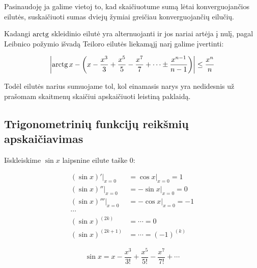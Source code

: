 Pasinaudoję ja galime vietoj to, kad skaičiuotume sumą lėtai 
konverguojančios eilutės, suskaičiuoti sumas dviejų žymiai greičiau
konverguojančių eilučių.

Kadangi $\mathop{\text{arctg}}$ skleidinio eilutė yra alternuojanti ir jos nariai artėja į
nulį, pagal Leibnico požymio išvadą Teiloro eilutės liekamąjį narį galime
įvertinti: 

\begin{equation}
  \left|\arctg x - \left(x - \frac{x^3}{3} + \frac{x^5}{5} - \frac{x^7}{7}%
    + \cdots \pm \frac{x^{n - 1}}{n - 1}\right) \right| \leq \frac{x^n}{n}
\end{equation}

Todėl eilutės narius sumuojame tol, kol einamasis narys yra nedidesnis už
prašomam skaitmenų skaičiui apskaičiuoti leistiną paklaidą.

\subsection{Trigonometrinių funkcijų reikšmių apskaičiavimas}

Išskleiskime $\sin x$ laipsnine eilute taške $0$:

\begin{align*}
  (\sin x)'|_{x=0} &= \cos x|_{x=0} = 1 \\
  (\sin x)''|_{x=0} &= -\sin x|_{x=0} = 0 \\
  (\sin x)''' |_{x=0} &= -\cos x|_{x=0} = -1 \\
  \cdots \\
  (\sin x)^{(2k)} &= \cdots = 0 \\
  (\sin x)^{(2k+1)} &= \cdots = (-1)^{(k)}
\end{align*}

\begin{equation}
  \sin x = x - \frac{x^3}{3!} + \frac{x^5}{5!} - \frac{x^7}{7!} + \cdots
  \label{sin_1}
\end{equation}

